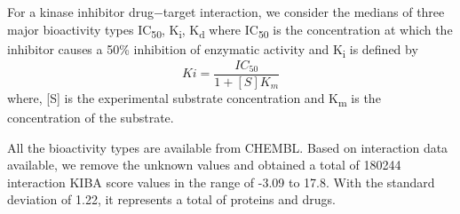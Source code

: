 For a kinase inhibitor drug−target interaction, we consider the medians of three major bioactivity types IC\textsubscript{50}, K\textsubscript{i}, K\textsubscript{d} where
IC\textsubscript{50} \citep{Tang2013} is the concentration at which the inhibitor causes a 50\% inhibition of enzymatic activity and K\textsubscript{i} is defined by \begin{equation}
    Ki = \frac{IC_{50}} {1 + [S]  K_m}
    \label{eq:ki}
\end{equation} 
where,  [{S}] is the experimental substrate concentration and K\textsubscript{m} is the concentration of the substrate.

\iffalse
\begin{equation}
    \tau= \frac{(a−b)}{n(n − 1)/2}   
    \label{eq:tau}
  \end{equation}
  { Here {a} and {b} represent the number of concordant pairs and discordant pairs respectively. }
\fi


All the bioactivity types are available from CHEMBL\citep{Gaulton2017}. Based on interaction data available, we remove the unknown values and obtained a total of 180244 interaction KIBA score values in the range of -3.09 to 17.8. With the standard deviation of 1.22, it represents a total of  proteins and  drugs.
